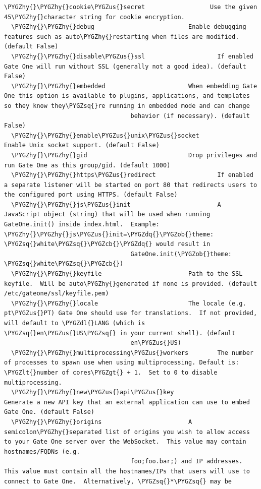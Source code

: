 \documentclass[letterpaper,10pt,openany]{sphinxmanual}
\def\PYGZus{\char`\_}
\def\PYGZob{\char`\{}
\def\PYGZcb{\char`\}}
\def\PYGZlt{\char`\<}
\def\PYGZgt{\char`\>}
\def\PYGZdl{\char`\$}
\def\PYGZhy{\char`\-}
\def\PYGZsq{\char`\'}
\def\PYGZdq{\char`\"}
\begin{document}
\begin{Verbatim}[commandchars=\\\{\}]
  \PYGZhy{}\PYGZhy{}cookie\PYGZus{}secret                  Use the given 45\PYGZhy{}character string for cookie encryption.
  \PYGZhy{}\PYGZhy{}debug                          Enable debugging features such as auto\PYGZhy{}restarting when files are modified. (default False)
  \PYGZhy{}\PYGZhy{}disable\PYGZus{}ssl                    If enabled Gate One will run without SSL (generally not a good idea). (default False)
  \PYGZhy{}\PYGZhy{}embedded                       When embedding Gate One this option is available to plugins, applications, and templates so they know they\PYGZsq{}re running in embedded mode and can change
                                   behavior (if necessary). (default False)
  \PYGZhy{}\PYGZhy{}enable\PYGZus{}unix\PYGZus{}socket             Enable Unix socket support. (default False)
  \PYGZhy{}\PYGZhy{}gid                            Drop privileges and run Gate One as this group/gid. (default 1000)
  \PYGZhy{}\PYGZhy{}https\PYGZus{}redirect                 If enabled a separate listener will be started on port 80 that redirects users to the configured port using HTTPS. (default False)
  \PYGZhy{}\PYGZhy{}js\PYGZus{}init                        A JavaScript object (string) that will be used when running GateOne.init() inside index.html.  Example: \PYGZhy{}\PYGZhy{}js\PYGZus{}init=\PYGZdq{}\PYGZob{}theme: \PYGZsq{}white\PYGZsq{}\PYGZcb{}\PYGZdq{} would result in
                                   GateOne.init(\PYGZob{}theme: \PYGZsq{}white\PYGZsq{}\PYGZcb{})
  \PYGZhy{}\PYGZhy{}keyfile                        Path to the SSL keyfile.  Will be auto\PYGZhy{}generated if none is provided. (default /etc/gateone/ssl/keyfile.pem)
  \PYGZhy{}\PYGZhy{}locale                         The locale (e.g. pt\PYGZus{}PT) Gate One should use for translations.  If not provided, will default to \PYGZdl{}LANG (which is \PYGZsq{}en\PYGZus{}US\PYGZsq{} in your current shell). (default
                                   en\PYGZus{}US)
  \PYGZhy{}\PYGZhy{}multiprocessing\PYGZus{}workers        The number of processes to spawn use when using multiprocessing. Default is: \PYGZlt{}number of cores\PYGZgt{} + 1.  Set to 0 to disable multiprocessing.
  \PYGZhy{}\PYGZhy{}new\PYGZus{}api\PYGZus{}key                    Generate a new API key that an external application can use to embed Gate One. (default False)
  \PYGZhy{}\PYGZhy{}origins                        A semicolon\PYGZhy{}separated list of origins you wish to allow access to your Gate One server over the WebSocket.  This value may contain hostnames/FQDNs (e.g.
                                   foo;foo.bar;) and IP addresses.  This value must contain all the hostnames/IPs that users will use to connect to Gate One.  Alternatively, \PYGZsq{}*\PYGZsq{} may be

\end{Verbatim}
\end{document}
